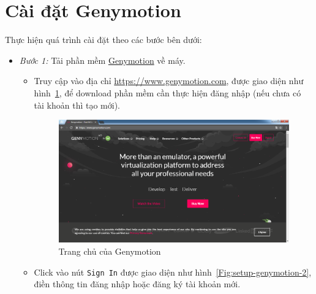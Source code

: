 \documentclass[13pt,a4paper]{extreport}
\begin{document}
\section{Cài đặt Genymotion}\label{Sec:Genymotion}
	Thực hiện quá trình cài đặt theo các bước bên dưới:
		\begin{itemize}
			\item \textit{Bước 1:} Tải phần mềm \href{https://www.genymotion.com/}{Genymotion} về máy.
				\begin{itemize}
					\item Truy cập vào địa chỉ \url{https://www.genymotion.com}, được giao diện như hình~\ref{Fig:setup-genymotion-1}, để download phần mềm cần thực hiện đăng nhập (nếu chưa có tài khoản thì tạo mới).
						\begin{figure}[!h]
							\begin{center}
								\includegraphics[scale=.35]{setup-genymotion-1}
							\end{center}
							\caption{Trang chủ của Genymotion}
							\label{Fig:setup-genymotion-1}
						\end{figure}
						
					\item Click vào nút \verb|Sign In| được giao diện như hình~\ref{Fig:setup-genymotion-2}, điền thông tin đăng nhập hoặc đăng ký tài khoản mới.
					

\end{itemize}
\end{itemize}
\end{document}
